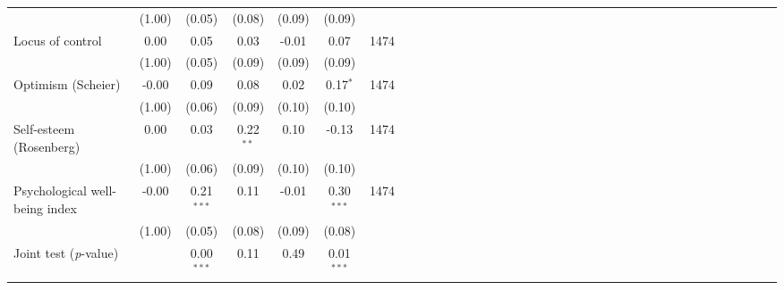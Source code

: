 {\begin{tabular}{l*{6}{SSSSSc}}
          &   (1.00)&   (0.05)&   (0.08)&   (0.09)&   (0.09)&         \\
Locus of control&     0.00&     0.05&     0.03&    -0.01&     0.07&     1474\\
          &   (1.00)&   (0.05)&   (0.09)&   (0.09)&   (0.09)&         \\
Optimism (Scheier)&    -0.00&     0.09&     0.08&     0.02&0.17$^{*}$&     1474\\
          &   (1.00)&   (0.06)&   (0.09)&   (0.10)&   (0.10)&         \\
Self-esteem (Rosenberg)&     0.00&     0.03&0.22$^{**}$&     0.10&    -0.13&     1474\\
          &   (1.00)&   (0.06)&   (0.09)&   (0.10)&   (0.10)&         \\
Psychological well-being index&    -0.00&0.21$^{***}$&     0.11&    -0.01&0.30$^{***}$&     1474\\
          &   (1.00)&   (0.05)&   (0.08)&   (0.09)&   (0.08)&         \\
\midrule Joint test (\emph{p}-value)&         &0.00$^{***}$&     0.11&     0.49&0.01$^{***}$&         \\
\bottomrule
\end{tabular}
}
